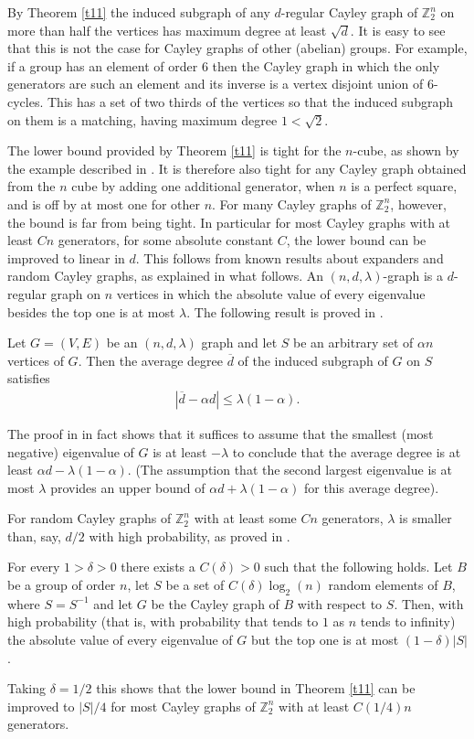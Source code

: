 By Theorem \ref{t11} the induced subgraph of any $d$-regular Cayley graph of ${\mathbb{Z}_{2}^{n}}$ on more than half the vertices has maximum 
degree at least $\sqrt d$. It is easy to see that this is not the case 
for Cayley graphs of other (abelian) groups. For example, 
if a group has an element of order $6$ then the Cayley graph in which the
only generators are such an element and its inverse is a vertex disjoint
union of $6$-cycles. This has a set of two thirds of the vertices so that
the induced subgraph on them is a matching, having maximum degree $1<
\sqrt 2$. 

The lower bound provided by Theorem \ref{t11} is  
tight for the $n$-cube,
as shown by the example described in 
\cite{CFGS}. It is therefore also tight for any Cayley graph obtained
from the $n$ cube by adding one additional generator, when $n$ is a perfect square, and is off by at most one for other $n$. For many Cayley
graphs of ${\mathbb{Z}_{2}^{n}}$, however, the bound is far from being tight. 
In particular for most Cayley graphs with at least $Cn$ generators,
for some absolute constant $C$, the lower bound can be
improved to linear in $d$. This follows from known
results about expanders and random Cayley graphs, as explained in
what follows.
An $(n,d,\lambda)$-graph is 
a $d$-regular graph on $n$ vertices in which the absolute value
of every eigenvalue besides the top one is at most $\lambda$.
The following result is proved in \cite{AC}. 
\begin{lemma}[\cite{AC}]
\label{AC}
Let $G = (V, E)$ be an $(n, d, \lambda)$ graph and let
$S$ be an arbitrary set of $\alpha n$ vertices of $G$. Then the average
degree $\overline{d}$ of the induced subgraph of $G$ on $S$ satisfies
\begin{align*}
    |\overline{d} - \alpha d| \leq \lambda (1-\alpha).
\end{align*}
\end{lemma}
The proof in \cite{AC} in fact  shows that it suffices 
to assume that the smallest (most negative) eigenvalue of
$G$ is at least $-\lambda$ to conclude that the average degree
is at least $\alpha d - \lambda (1-\alpha)$. (The assumption that
the second largest eigenvalue is at most $\lambda$ provides an
upper bound of $\alpha d + \lambda (1-\alpha)$ for this average degree).

For random Cayley graphs 
of ${\mathbb{Z}_{2}^{n}}$ with at least some $Cn$ generators,
$\lambda$ is smaller than, say, $d/2$ with high probability, as
proved in \cite{AR}. 
\begin{prop}[\cite{AR}]
\label{p41}
For every $1 > \delta > 0$ there exists a 
$C(\delta) > 0$ such that the following holds. Let $B$ be a 
group of order $n$, let $S$ be a set of $C(\delta)\log_2(n)$ 
random elements of $B$, where $S=S^{-1}$ and let 
$G$ be the Cayley graph of $B$ 
with respect to $S$. Then, with high probability (that is, with probability
that tends to $1$ as $n$ tends to infinity) the absolute value of
every eigenvalue of $G$ but the top one is at
most $(1-\delta)|S|$.
\end{prop}
Taking $\delta=1/2$ this shows that the lower bound in
Theorem \ref{t11} can be improved to $|S|/4$ for most 
Cayley graphs  of ${\mathbb{Z}_{2}^{n}}$ with at least $C(1/4)n$ generators.

